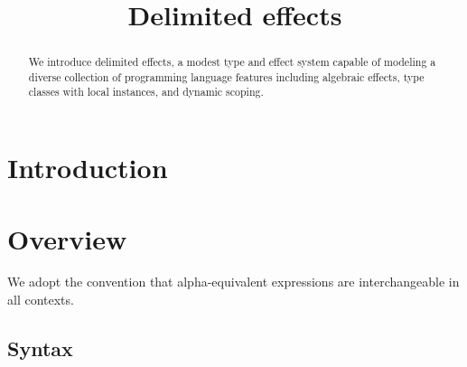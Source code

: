 \documentclass[12pt]{article}
\title{Delimited effects}
\date{}
\begin{document}
  \maketitle

  \begin{abstract}
    We introduce delimited effects, a modest type and effect system capable of modeling a diverse collection of programming language features including algebraic effects, type classes with local instances, and dynamic scoping.
  \end{abstract}

  \section{Introduction}

    \iffalse
      \begin{lstlisting}[gobble=4]
        effect IO
          getLine   : String ! IO
          printLine : String -> () ! IO
      \end{lstlisting}

      \begin{lstlisting}[gobble=4]
        effect Monoid a
          mempty  : a ! Monoid a
          mappend : a -> a -> a ! Monoid a
      \end{lstlisting}
    \fi

  \section{Overview}

    We adopt the convention that alpha-equivalent expressions are interchangeable in all contexts.

    \subsection{Syntax}
\end{document}
